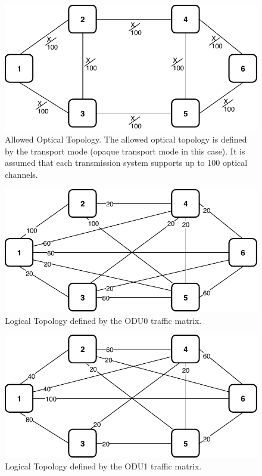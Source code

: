 \begin{figure}[h!]
\centering
\includegraphics[width=12cm]{sdf/ilp/opaque_protection/figures/allowed_optical_topology}
\caption{Allowed Optical Topology. The allowed optical topology is defined by the transport mode (opaque transport mode in this case). It is assumed that each transmission system supports up to 100 optical channels.}
\label{allowed_optical_protectionhigh}
\end{figure}
\newpage
\begin{figure}[h!]
\centering
\includegraphics[width=12cm]{sdf/ilp/opaque_protection/figures/logical_topology_ODU0_high}
\caption{Logical Topology defined by the ODU0 traffic matrix.}
\label{logical_ODU0_protectionhigh}
\end{figure}

\begin{figure}[h!]
\centering
\includegraphics[width=12cm]{sdf/ilp/opaque_protection/figures/logical_topology_ODU1_high}
\caption{Logical Topology defined by the ODU1 traffic matrix.}
\label{logical_ODU1_protectionhigh}
\end{figure}

